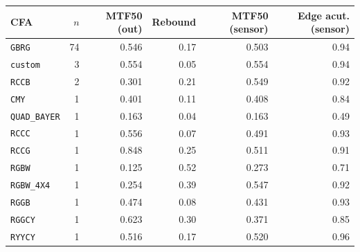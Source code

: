 \begin{tabular}{@{}lrrrrr@{}}
\toprule
CFA & $n$ & MTF50 (out) & Rebound & MTF50 (sensor) & Edge acut. (sensor) \\
\midrule
\texttt{GBRG} & 74 & 0.546 & 0.17 & 0.503 & 0.94 \\
\texttt{custom} & 3 & 0.554 & 0.05 & 0.554 & 0.94 \\
\texttt{RCCB} & 2 & 0.301 & 0.21 & 0.549 & 0.92 \\
\texttt{CMY} & 1 & 0.401 & 0.11 & 0.408 & 0.84 \\
\texttt{QUAD\_BAYER} & 1 & 0.163 & 0.04 & 0.163 & 0.49 \\
\texttt{RCCC} & 1 & 0.556 & 0.07 & 0.491 & 0.93 \\
\texttt{RCCG} & 1 & 0.848 & 0.25 & 0.511 & 0.91 \\
\texttt{RGBW} & 1 & 0.125 & 0.52 & 0.273 & 0.71 \\
\texttt{RGBW\_4X4} & 1 & 0.254 & 0.39 & 0.547 & 0.92 \\
\texttt{RGGB} & 1 & 0.474 & 0.08 & 0.431 & 0.93 \\
\texttt{RGGCY} & 1 & 0.623 & 0.30 & 0.371 & 0.85 \\
\texttt{RYYCY} & 1 & 0.516 & 0.17 & 0.520 & 0.96 \\
\bottomrule
\end{tabular}
